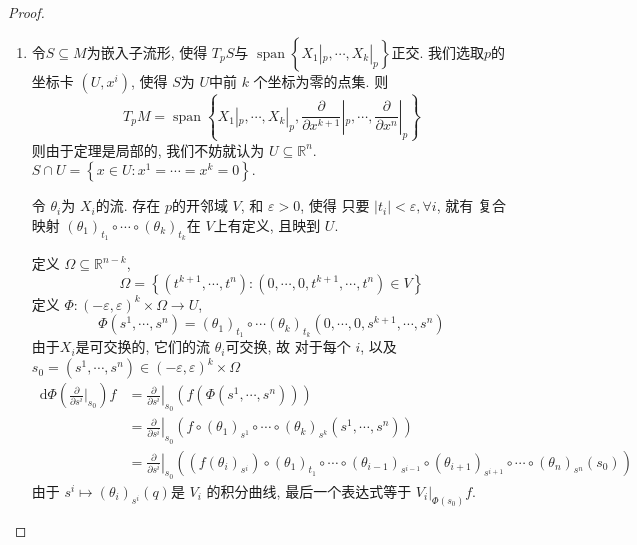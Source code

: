 \documentclass[../main.tex]{subfiles}
\begin{document}
\begin{proof}
    \begin{enumerate}
        \item  令\(  S\subseteq M  \)为嵌入子流形, 使得 \(  T_{p}S  \)与 \(  \operatorname{span}\left\{ X_1|_{p},\cdots ,X_{k}|_{p} \right\}  \)正交. 我们选取\(  p  \)的坐标卡 \(  \left( U,x^{i} \right)   \), 使得 \(  S  \)为 \(  U  \)中前 \(  k  \) 个坐标为零的点集. 则 \[
        T_{p}M= \operatorname{span}\left\{ X_1|_{p},\cdots , X_{k}|_{p},\frac{\partial }{\partial x^{k+ 1}}|_{p},\cdots , \frac{\partial }{\partial x^{n}}|_{p} \right\}
        \] 则由于定理是局部的, 我们不妨就认为 \(  U\subseteq \mathbb{R} ^{n}  \).    \(  S \cap U= \left\{ x\in U:x^{1}= \cdots = x^{k}= 0 \right\} \). 
        
        令 \(   \theta _{i}  \)为 \(  X_{i}  \)的流.  
        存在 \(  p  \)的开邻域 \(  V  \), 和 \(   \varepsilon > 0  \), 使得    只要 \(  \left| t_{i} \right|<  \varepsilon ,\forall i   \), 就有 复合映射 \(   \left(  \theta _1  \right)_{t_1}\circ \cdots \circ \left(  \theta _{k} \right)_{t_{k}}    \)在 \(  V  \)上有定义, 且映到 \(  U  \).
        
        定义 \(   \Omega \subseteq \mathbb{R} ^{n-k}  \), \[
         \Omega = \left\{ \left( t^{k+ 1},\cdots ,t^{n} \right): \left( 0,\cdots ,0, t^{k+ 1},\cdots ,t^{n} \right)\in V   \right\}
        \] 定义 \(  \Phi :\left( - \varepsilon , \varepsilon  \right)^{k}\times  \Omega \to U   \),  \[
        \Phi \left( s^{1},\cdots ,s^{n}\right)= \left(  \theta _1  \right)_{t_1}\circ \cdots \left(  \theta _{k} \right)_{t_{k}}\left( 0,\cdots ,0,s^{k+ 1},\cdots ,s^{n} \right)    
        \] 由于\(  X_{i}  \)是可交换的, 它们的流 \(   \theta _{i}  \)可交换, 故 对于每个 \(  i  \), 以及 \(  s_0= \left( s^{1},\cdots ,s^{n} \right) \in \left( - \varepsilon , \varepsilon  \right)^{k}\times  \Omega    \) \begin{equation}
            \begin{aligned}
               \,\mathrm{d} \Phi \left( \frac{\partial }{\partial s^{i}}|_{s_0} \right)f &= \left. \frac{\partial }{\partial s^{i}} \right|_{s_0}\left( f\left( \Phi \left( s^{1},\cdots ,s^{n} \right)  \right)  \right)\\ 
                &= \left. \frac{\partial }{\partial s^{i}} \right|_{s_0}\left( f \circ \left(  \theta _1  \right)_{s^{1}}\circ \cdots \circ \left(  \theta _{k} \right)_{s^{k}}\left( s^{1},\cdots ,s^{n} \right)    \right)\\ 
                 &= \left. \frac{\partial }{\partial s^{i}} \right|_{s_0}\left( \left( f\left(  \theta _{i} \right)_{s^{i}}  \right)\circ \left(  \theta _1  \right)_{t_1}   \circ \cdots \circ \left(  \theta _{i-1} \right)_{s^{i-1}}\circ\left(  \theta _{i+ 1} \right)_{s^{i+ 1}}\circ \cdots \circ \left(  \theta _{n} \right)_{s^{n}}   \left( s_0 \right) \right)    
            \end{aligned}
        \end{equation}   
        由于 \(  s^{i}\mapsto \left(  \theta _{i} \right)_{s^{i}}\left( q \right)    \)是 \( V_{i}   \)  的积分曲线, 最后一个表达式等于 \(  V_{i}|_{\Phi \left( s_0 \right) }f  \).
        

\end{enumerate}
\end{proof}
\end{document}
